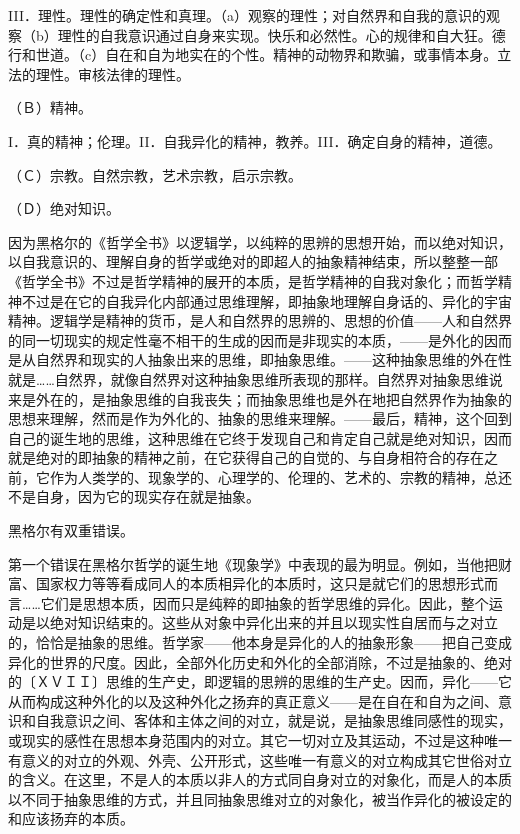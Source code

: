 \documentclass[a4paper,twoside,12pt]{ctexart}
\begin{document}
III．理性。理性的确定性和真理。（a）观察的理性；对自然界和自我的意识的观察（b）理性的自我意识通过自身来实现。快乐和必然性。心的规律和自大狂。德行和世道。（c）自在和自为地实在的个性。精神的动物界和欺骗，或事情本身。立法的理性。审核法律的理性。

（Ｂ）精神。

I．真的精神；伦理。II．自我异化的精神，教养。III．确定自身的精神，道德。

（Ｃ）宗教。自然宗教，艺术宗教，启示宗教。

（Ｄ）绝对知识。

因为黑格尔的《哲学全书》以逻辑学，以纯粹的思辨的思想开始，而以绝对知识，以自我意识的、理解自身的哲学或绝对的即超人的抽象精神结束，所以整整一部《哲学全书》不过是哲学精神的展开的本质，是哲学精神的自我对象化；而哲学精神不过是在它的自我异化内部通过思维理解，即抽象地理解自身话的、异化的宇宙精神。逻辑学是精神的货币，是人和自然界的思辨的、思想的价值——人和自然界的同一切现实的规定性毫不相干的生成的因而是非现实的本质，——是外化的因而是从自然界和现实的人抽象出来的思维，即抽象思维。——这种抽象思维的外在性就是……自然界，就像自然界对这种抽象思维所表现的那样。自然界对抽象思维说来是外在的，是抽象思维的自我丧失；而抽象思维也是外在地把自然界作为抽象的思想来理解，然而是作为外化的、抽象的思维来理解。——最后，精神，这个回到自己的诞生地的思维，这种思维在它终于发现自己和肯定自己就是绝对知识，因而就是绝对的即抽象的精神之前，在它获得自己的自觉的、与自身相符合的存在之前，它作为人类学的、现象学的、心理学的、伦理的、艺术的、宗教的精神，总还不是自身，因为它的现实存在就是抽象。

黑格尔有双重错误。

第一个错误在黑格尔哲学的诞生地《现象学》中表现的最为明显。例如，当他把财富、国家权力等等看成同人的本质相异化的本质时，这只是就它们的思想形式而言……它们是思想本质，因而只是纯粹的即抽象的哲学思维的异化。因此，整个运动是以绝对知识结束的。这些从对象中异化出来的并且以现实性自居而与之对立的，恰恰是抽象的思维。哲学家——他本身是异化的人的抽象形象——把自己变成异化的世界的尺度。因此，全部外化历史和外化的全部消除，不过是抽象的、绝对的〔ＸＶＩＩ〕思维的生产史，即逻辑的思辨的思维的生产史。因而，异化——它从而构成这种外化的以及这种外化之扬弃的真正意义——是在自在和自为之间、意识和自我意识之间、客体和主体之间的对立，就是说，是抽象思维同感性的现实，或现实的感性在思想本身范围内的对立。其它一切对立及其运动，不过是这种唯一有意义的对立的外观、外壳、公开形式，这些唯一有意义的对立构成其它世俗对立的含义。在这里，不是人的本质以非人的方式同自身对立的对象化，而是人的本质以不同于抽象思维的方式，并且同抽象思维对立的对象化，被当作异化的被设定的和应该扬弃的本质。
\end{document}
